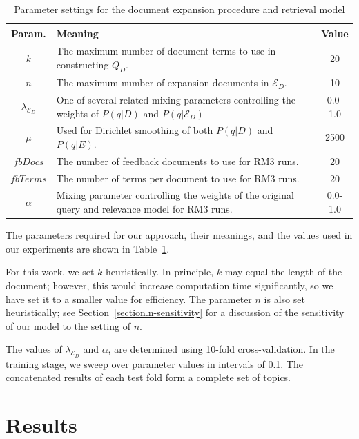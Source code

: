 \documentclass[sigconf]{acmart}
\begin{document}
\begin{table}[htb]
\caption{Parameter settings for the document expansion procedure and retrieval model}
\centering
\begin{tabular}{|c|p{}|c|} \hline
{\bf Param.} & {\bf Meaning} & {\bf Value} \\ \hline
$k$ & The maximum number of document terms to use in constructing $Q_D$. & 20 \\ \hline
$n$ & The maximum number of expansion documents in $\mathcal{E}_D$. & 10 \\ \hline
$\lambda_{\mathcal{E}_D}$ & One of several related mixing parameters controlling the weights of $P(q|D)$ and $P(q|\mathcal{E}_D)$ & 0.0-1.0 \\ \hline
$\mu$ & Used for Dirichlet smoothing of both $P(q|D)$ and $P(q|E)$. & 2500 \\ \hline
$fbDocs$ & The number of feedback documents to use for RM3 runs. & 20 \\ \hline
$fbTerms$ & The number of terms per document to use for RM3 runs. & 20 \\ \hline
$\alpha$ & Mixing parameter controlling the weights of the original query and relevance model for RM3 runs. & 0.0-1.0 \\ \hline
\end{tabular}
\label{table.parameters}
\end{table}

The parameters required for our approach, their meanings, and the values used in our experiments are shown in Table~\ref{table.parameters}. 

For this work, we set $k$ heuristically. In principle, $k$ may equal the length of the document; however, this would increase computation time significantly, so we have set it to a smaller value for efficiency. The parameter $n$ is also set heuristically; see Section~\ref{section.n-sensitivity} for a discussion of the sensitivity of our model to the setting of $n$.

The values of $\lambda_{\mathcal{E}_D}$ and $\alpha$, are determined using 10-fold cross-validation. In the training stage, we sweep over parameter values in intervals of 0.1. The concatenated results of each test fold form a complete set of topics.

\section{Results}\label{section.results}
\end{document}
